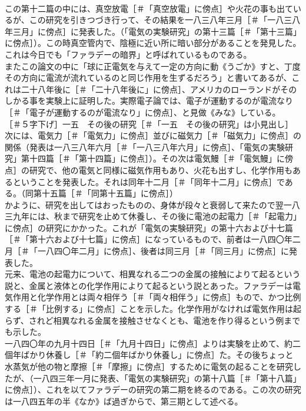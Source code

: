 \documentclass[8pt]{extreport}
\begin{document}
\begin{CJK}{UTF8}{min}
\\	この第十二篇の中には、真空放電［＃「真空放電」に傍点］や火花の事も出ているが、この研究を引きつづき行って、その結果を一八三八年三月［＃「一八三八年三月」に傍点］に発表した。（「電気の実験研究」の第十三篇［＃「第十三篇」に傍点］）。この時真空管内で、陰極に近い所に暗い部分があることを発見した。これは今日でも「ファラデーの暗界」と呼ばれているものである。
\\	またこの論文の中に「球に正電気を与えて一定の方向に動《うごか》すと、丁度その方向に電流が流れているのと同じ作用を生ずるだろう」と書いてあるが、これは二十八年後に［＃「二十八年後に」に傍点］、アメリカのローランドがそのしかる事を実験上に証明した。実際電子論では、電子が運動するのが電流なり［＃「電子が運動するのが電流なり」に傍点］、と見做《みな》している。
\\	［＃５字下げ］一五　その後の研究［＃「一五　その後の研究」は小見出し］
\\	次には、電気力［＃「電気力」に傍点］並びに磁気力［＃「磁気力」に傍点］の関係（発表は一八三八年六月［＃「一八三八年六月」に傍点］、「電気の実験研究」第十四篇［＃「第十四篇」に傍点］）。その次は電気鰻［＃「電気鰻」に傍点］の研究で、他の電気と同様に磁気作用もあり、火花も出すし、化学作用もあるということを発表した。それは同年十二月［＃「同年十二月」に傍点］である。（同第十五篇［＃「同第十五篇」に傍点］）
\\	かように、研究を出してはおったものの、身体が段々と衰弱して来たので翌一八三九年には、秋まで研究を止めて休養し、その後に電池の起電力［＃「起電力」に傍点］の研究にかかった。これが「電気の実験研究」の第十六および十七篇［＃「第十六および十七篇」に傍点］になっているもので、前者は一八四〇年二月［＃「一八四〇年二月」に傍点］、後者は同三月［＃「同三月」に傍点］に発表した。
\\	元来、電池の起電力について、相異なれる二つの金属の接触によりて起るという説と、金属と液体との化学作用によりて起るという説とあった。ファラデーは電気作用と化学作用とは両々相伴う［＃「両々相伴う」に傍点］もので、かつ比例する［＃「比例する」に傍点］ことを示した。化学作用がなければ電気作用は起らず、されど相異なれる金属を接触させなくとも、電池を作り得るという例までも示した。
\\	一八四〇年の九月十四日［＃「九月十四日」に傍点］よりは実験を止めて、約二個年ばかり休養し［＃「約二個年ばかり休養し」に傍点］た。その後ちょっと水蒸気が他の物と摩擦［＃「摩擦」に傍点］するために電気の起ることを研究したが、（一八四三年一月に発表、「電気の実験研究」の第十八篇［＃「第十八篇」に傍点］）、これを以てファラデーの研究の第二期を終るのである。この次の研究は一八四五年の半《なか》ば過ぎからで、第三期として述べる。

\end{CJK}
\end{document}
